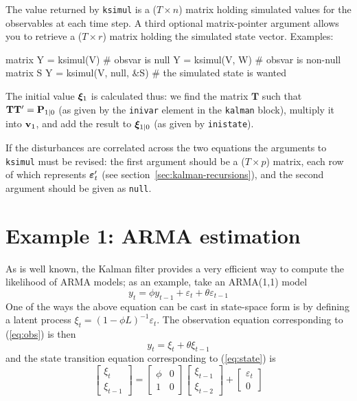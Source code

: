 The value returned by \texttt{ksimul} is a ($T \times n$) matrix
holding simulated values for the observables at each time step.  A
third optional matrix-pointer argument allows you to retrieve a ($T
\times r$) matrix holding the simulated state vector.  Examples:
%
\begin{code}
matrix Y = ksimul(V)    # obsvar is null
Y = ksimul(V, W)        # obsvar is non-null
matrix S
Y = ksimul(V, null, &S) # the simulated state is wanted
\end{code}

The initial value $\bm{\xi}_1$ is calculated thus: we find the matrix
$\mathbf{T}$ such that $\mathbf{T}\mathbf{T}' = \mathbf{P}_{1|0}$ (as
given by the \texttt{inivar} element in the \texttt{kalman} block),
multiply it into $\mathbf{v}_1$, and add the result to $\bm{\xi}_{1|0}$
(as given by \texttt{inistate}).

If the disturbances are correlated across the two equations the
arguments to \texttt{ksimul} must be revised: the first argument
should be a ($T \times p$) matrix, each row of which represents
$\bm{\varepsilon}_t'$ (see section~\ref{sec:kalman-recursions}), and the
second argument should be given as \texttt{null}.



\section{Example 1: ARMA estimation}
\label{sec:example_arma}

As is well known, the Kalman filter provides a very efficient way to
compute the likelihood of ARMA models; as an example, take an
ARMA(1,1) model
\[
  y_t = \phi y_{t-1} + \varepsilon_t + \theta \varepsilon_{t-1}
\]
One of the ways the above equation can be cast in state-space form is
by defining a latent process $\xi_t = (1 - \phi L)^{-1}
\varepsilon_t$.   The observation equation corresponding to (\ref{eq:obs})
is then
%
\begin{equation}
y_t = \xi_t + \theta \xi_{t-1} \label{eq:arma-meas}
\end{equation}
%
and the state transition equation corresponding to (\ref{eq:state}) is
%
\[
  \left[ \begin{array}{c} \xi_t \\ \xi_{t-1} \end{array} \right] =
  \left[ \begin{array}{cc} \phi & 0 \\ 1 & 0 \end{array} \right]
  \left[ \begin{array}{c} \xi_{t-1} \\ \xi_{t-2} \end{array} \right] +
  \left[ \begin{array}{c} \varepsilon_t \\ 0 \end{array} \right] 
\]

